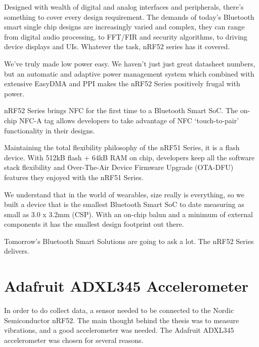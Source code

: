  

Designed with wealth of digital and analog interfaces and peripherals, there’s something to cover every design requirement. The demands of today’s Bluetooth smart single chip designs are increasingly varied and complex, they can range from digital audio processing, to FFT/FIR and security algorithms, to driving device displays and UIs. Whatever the task, nRF52 series has it covered.

 

We’ve truly made low power easy. We haven’t just just great datasheet numbers, but an automatic and adaptive power management system which combined with extensive EasyDMA and PPI makes the nRF52 Series positively frugal with power.

 

nRF52 Series brings NFC for the first time to a Bluetooth Smart SoC. The on-chip NFC-A tag allows developers to take advantage of NFC ‘touch-to-pair’ functionality in their designs.

 

Maintaining the total flexibility philosophy of the nRF51 Series, it is a flash device. With 512kB flash + 64kB RAM on chip, developers keep all the software stack flexibility and Over-The-Air Device Firmware Upgrade (OTA-DFU) features they enjoyed with the nRF51 Series.

 

We understand that in the world of wearables, size really is everything, so we built a device that is the smallest Bluetooth Smart SoC to date measuring as small as 3.0 x 3.2mm (CSP). With an on-chip balun and a minimum of external components it has the smallest design footprint out there.

 

Tomorrow’s Bluetooth Smart Solutions are going to ask a lot. The nRF52 Series delivers.




\section{Adafruit ADXL345 Accelerometer}

In order to do collect data, a sensor needed to be connected to the Nordic Semiconductor nRF52. The main thought behind the thesis was to measure vibrations, and a good accelerometer was needed. The Adafruit ADXL345 accelerometer was chosen for several reasons. 

